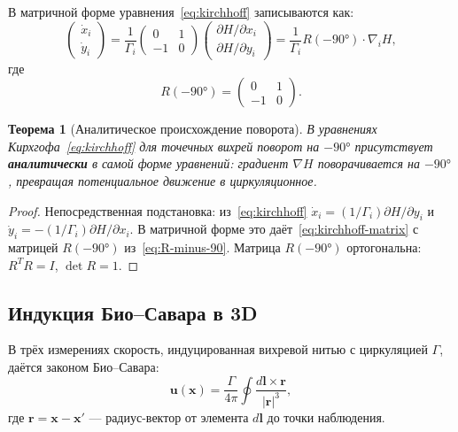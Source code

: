 \documentclass[11pt,a4paper,twoside]{article}
\newtheorem{theorem}{Теорема}[section]
\theoremstyle{remark}
\begin{document}
В матричной форме уравнения~\eqref{eq:kirchhoff} записываются как:
\begin{equation}
\begin{pmatrix} \dot{x}_i \\ \dot{y}_i \end{pmatrix} = \frac{1}{\Gamma_i}\begin{pmatrix} 0 & 1 \\ -1 & 0 \end{pmatrix}\begin{pmatrix} \partial H/\partial x_i \\ \partial H/\partial y_i \end{pmatrix} = \frac{1}{\Gamma_i}R(-90°)\cdot\nabla_i H,
\label{eq:kirchhoff-matrix}
\end{equation}
где
\begin{equation}
R(-90°) = \begin{pmatrix} 0 & 1 \\ -1 & 0 \end{pmatrix}.
\label{eq:R-minus-90}
\end{equation}

\begin{theorem}[Аналитическое происхождение поворота]
\label{thm:kirchhoff-rotation}
В уравнениях Кирхгофа~\eqref{eq:kirchhoff} для точечных вихрей поворот на $-90°$ присутствует \textbf{аналитически} в самой форме уравнений: градиент $\nabla H$ поворачивается на $-90°$, превращая потенциальное движение в циркуляционное.
\end{theorem}

\begin{proof}
Непосредственная подстановка: из~\eqref{eq:kirchhoff} $\dot{x}_i = (1/\Gamma_i)\partial H/\partial y_i$ и $\dot{y}_i = -(1/\Gamma_i)\partial H/\partial x_i$. В матричной форме это даёт~\eqref{eq:kirchhoff-matrix} с матрицей $R(-90°)$ из~\eqref{eq:R-minus-90}. Матрица $R(-90°)$ ортогональна: $R^T R = I$, $\det R = 1$.
\end{proof}

\subsection{Индукция Био--Савара в 3D}

В трёх измерениях скорость, индуцированная вихревой нитью с циркуляцией $\Gamma$, даётся законом Био--Савара:
\begin{equation}
\mathbf{u}(\mathbf{x}) = \frac{\Gamma}{4\pi}\oint\frac{d\mathbf{l}\times\mathbf{r}}{|\mathbf{r}|^3},
\label{eq:biot-savart}
\end{equation}
где $\mathbf{r} = \mathbf{x} - \mathbf{x}'$ --- радиус-вектор от элемента $d\mathbf{l}$ до точки наблюдения.
\end{document}
